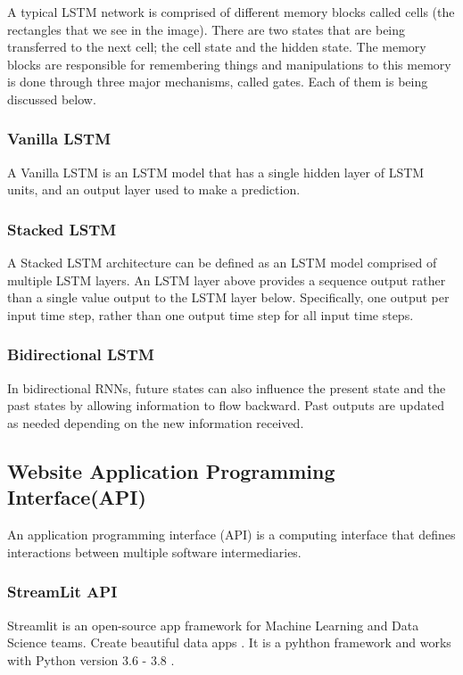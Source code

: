 \documentclass[12pt]{report}
\begin{document}
A typical LSTM network is comprised of different memory blocks called cells
(the rectangles that we see in the image).  There are two states that are being transferred to the next cell; the cell state and the hidden state. The memory blocks are responsible for remembering things and manipulations to this memory is done through three major mechanisms, called gates. Each of them is being discussed below.

\subsubsection{Vanilla LSTM}
A Vanilla LSTM is an LSTM model that has a single hidden layer of LSTM units, and an output layer used to make a prediction. \cite{18}

\subsubsection{Stacked LSTM}

A Stacked LSTM architecture can be defined as an LSTM model comprised of multiple LSTM layers. An LSTM layer above provides a sequence output rather than a single value output to the LSTM layer below. Specifically, one output per input time step, rather than one output time step for all input time steps.

\subsubsection{Bidirectional LSTM}
In bidirectional RNNs, future states can also influence the present state and the past states by allowing information to flow backward. Past outputs are updated as needed depending on the new information received.

\subsection{Website Application Programming Interface(API)}
An application programming interface (API) is a computing interface that defines interactions between multiple software intermediaries. 

\subsubsection{StreamLit API}
Streamlit is an open-source app framework for Machine Learning and Data Science teams. Create beautiful data apps .\cite{19}
It is a pyhthon framework and works with Python version 3.6 - 3.8 .
\end{document}
